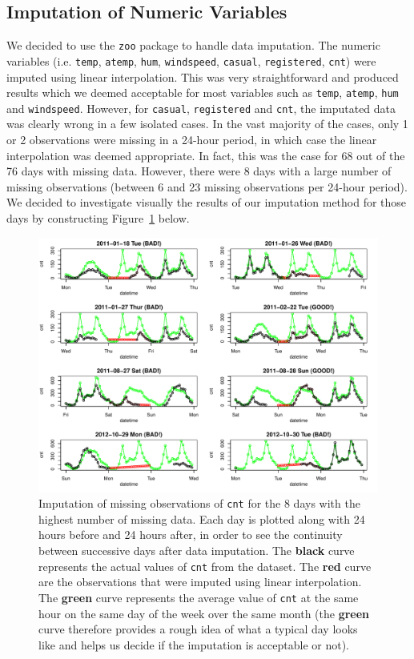 \documentclass[12pt]{article}
\begin{document}
\subsection{Imputation of Numeric Variables}
We decided to use the \texttt{zoo} package to handle data imputation. The numeric variables (i.e. \texttt{temp}, \texttt{atemp}, \texttt{hum}, \texttt{windspeed}, \texttt{casual}, \texttt{registered}, \texttt{cnt}) were imputed using linear interpolation. This was very straightforward and produced results which we deemed acceptable for most variables such as \texttt{temp}, \texttt{atemp}, \texttt{hum} and \texttt{windspeed}. However, for \texttt{casual}, \texttt{registered} and \texttt{cnt}, the imputated data was clearly wrong in a few isolated cases. In the vast majority of the cases, only 1 or 2 observations were missing in a 24-hour period, in which case the linear interpolation was deemed appropriate. In fact, this was the case for 68 out of the 76 days with missing data. However, there were 8 days with a large number of missing observations (between 6 and 23 missing observations per 24-hour period). We decided to investigate visually the results of our imputation method for those days by constructing Figure~\ref{fig:badrows} below.
\begin{figure}[H]
	\centering
	\includegraphics[width=.98\textwidth]{figures/badrows.pdf}
	\caption{Imputation of missing observations of \texttt{cnt} for the 8 days with the highest number of missing data. Each day is plotted along with 24 hours before and 24 hours after, in order to see the continuity between successive days after data imputation. The {\textbf{\color{black}black}} curve represents the actual values of \texttt{cnt} from the dataset. The {\textbf{\color{red}red}} curve are the observations that were imputed using linear interpolation. The {\textbf{\color{green}green}} curve represents the average value of \texttt{cnt} at the same hour on the same day of the week over the same month (the {\textbf{\color{green}green}} curve therefore provides a rough idea of what a typical day looks like and helps us decide if the imputation is acceptable or not).}
	\label{fig:badrows}
\end{figure}
\end{document}
